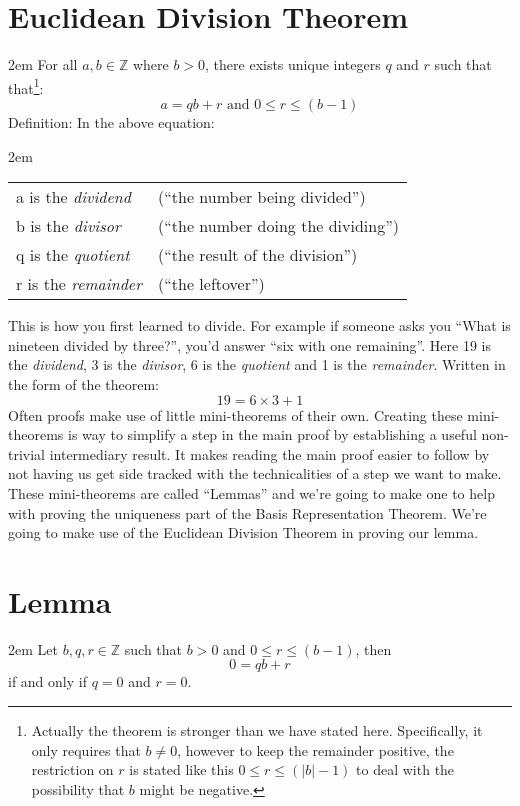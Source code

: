 \documentclass{article}
\newenvironment{jprIn}{\begin{adjustwidth}{2em}{}}{\end{adjustwidth}}
\begin{document}
\section*{Euclidean Division Theorem}
\begin{jprIn}
For all $a,b\in{}\mathbb{Z}$ where $b>0$, there exists unique integers $q$ and $r$ such
that
that\footnote{Actually the theorem is stronger than we have stated here. Specifically, it only requires that $b\ne0$, however
to keep the remainder positive, the restriction on $r$ is stated like
this $0 \le r \le (\left|b\right|-1)$ to deal with the possibility that $b$ might be negative.}:
\[a=qb+r  \text{ and } 0\le{}r\le{}(b-1)\]
Definition: In the above equation:
\begin{jprIn}
\begin{tabular}{l l}
a is the \emph{dividend} & (``the number being divided'')\\
b is the \emph{divisor} & (``the number doing the dividing'')\\
q is the \emph{quotient} & (``the result of the division'')\\
r is the \emph{remainder} & (``the leftover'')
\end{tabular}
\end{jprIn}
\end{jprIn}
This is how you first learned to divide.
For example if someone asks you ``What is nineteen divided by three?'', you’d
answer ``six with one remaining''. Here 19 is the \emph{dividend},  3 is the \emph{divisor},
6 is the \emph{quotient} and 1 is the \emph{remainder}. Written in the form of the theorem:
\[19=6\times3+1\]
Often proofs make use of little mini-theorems of their own.
Creating these mini-theorems is way to simplify a step in
the main proof by establishing a useful non-trivial
intermediary result. It makes reading the main proof
easier to follow by not having us get side tracked with
the technicalities of a step we want to make.
These mini-theorems are called ``Lemmas''
and we’re going to make one to help with proving the uniqueness part
of the Basis Representation Theorem. We're going to make use of the
Euclidean Division Theorem in proving our lemma.

\section*{Lemma}
\begin{jprIn}
Let $b, q, r \in{} \mathbb{Z}$ such that $b>0$ and $0\le{}r\le(b-1)$, then
\[0=qb+r\]
if and only if $q=0$ and $r=0$.
\end{jprIn}
\end{document}
